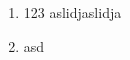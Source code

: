 \documentclass{article}
\begin{document}


\begin{enumerate}
        \item 123
aslidjaslidja
        \item asd

\end{enumerate}
\end{document}
